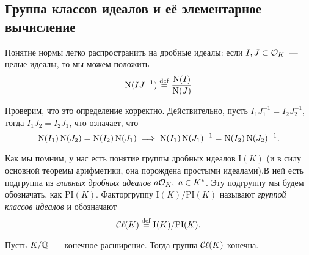 	\subsection{Группа классов идеалов и её элементарное вычисление}

	Понятие нормы легко распространить на дробные идеалы: если $I, J \subset \mathcal{O}_{K}$~--- целые идеалы, то мы можем положить 
	\[
		\operatorname{\mathrm{N}}(I J^{-1}) \stackrel{\mathrm{def}}{=} \frac{\operatorname{\mathrm{N}}(I)}{\operatorname{\mathrm{N}}(J)} 
	\]

	Проверим, что это определение корректно. Действительно, пусть $I_1 J_1^{-1} = I_{2} J_{2}^{-1}$, тогда  $I_1 J_2 = I_2 J_1$, что означает, что 
	\[
		\operatorname{\mathrm{N}}(I_1)\operatorname{\mathrm{N}}(J_2) = \operatorname{\mathrm{N}}(I_2)\operatorname{\mathrm{N}}(J_1) \implies \operatorname{\mathrm{N}}(I_1)\operatorname{\mathrm{N}}(J_1)^{-1} = \operatorname{\mathrm{N}}(I_2) \operatorname{\mathrm{N}}(J_2)^{-1}.
	\]

	\begin{definition} 
		Как мы помним, у нас есть понятие группы дробных идеалов $\mathrm{I}(K)$ (и в силу основной теоремы арифметики, она порождена простыми идеалами).В ней есть подгруппа из \emph{главных дробных идеалов} $a\mathcal{O}_{K}, \ a \in K^{*}$.  Эту подгруппу мы будем обозначать, как $\mathrm{PI}(K)$. Факторгруппу $\mathrm{I}(K)/\mathrm{PI}(K)$ называют \emph{группой классов идеалов} и обозначают 
	\[
		\operatorname{\mathcal{C}\mathbf{\ell}}(K) \stackrel{\mathrm{def}}{=} \mathrm{I}(K)/\mathrm{PI}(K).
	\]
	\end{definition}

	


	\begin{theorem} 
		Пусть $K/\mathbb{Q}$~--- конечное расширение. Тогда группа $\operatorname{\mathcal{C}\mathbf{\ell}}(K)$ конечна. 
	\end{theorem}

